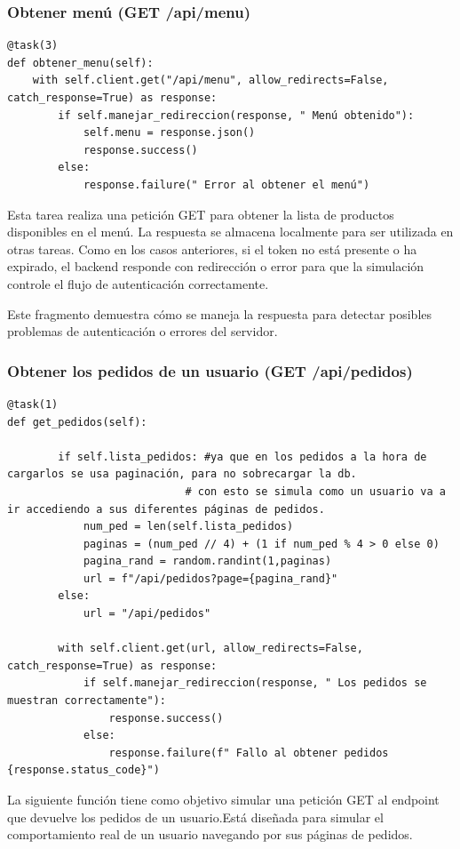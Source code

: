 \documentclass[10pt]{book}
\begin{document}
\subsubsection{Obtener menú (GET /api/menu)}

\begin{lstlisting}[style=pythonclean, caption={Tarea para obtener el menú de productos}]
@task(3)
def obtener_menu(self):
    with self.client.get("/api/menu", allow_redirects=False, catch_response=True) as response:
        if self.manejar_redireccion(response, " Menú obtenido"):
            self.menu = response.json()
            response.success()
        else:
            response.failure(" Error al obtener el menú")
\end{lstlisting}

Esta tarea realiza una petición GET para obtener la lista de productos disponibles en el menú. La respuesta se almacena localmente para ser utilizada en otras tareas. Como en los casos anteriores, si el token no está presente o ha expirado, el backend responde con redirección o error para que la simulación controle el flujo de autenticación correctamente.


Este fragmento demuestra cómo se maneja la respuesta para detectar posibles problemas de autenticación o errores del servidor.

\subsubsection{Obtener los pedidos de un usuario (GET /api/pedidos)}
\begin{lstlisting}[style=pythonclean, caption={Tarea para obtener el menú de productos}]
@task(1)
def get_pedidos(self):

        if self.lista_pedidos: #ya que en los pedidos a la hora de cargarlos se usa paginación, para no sobrecargar la db.
                            # con esto se simula como un usuario va a ir accediendo a sus diferentes páginas de pedidos.
            num_ped = len(self.lista_pedidos)
            paginas = (num_ped // 4) + (1 if num_ped % 4 > 0 else 0)
            pagina_rand = random.randint(1,paginas)
            url = f"/api/pedidos?page={pagina_rand}"
        else:
            url = "/api/pedidos"

        with self.client.get(url, allow_redirects=False, catch_response=True) as response:
            if self.manejar_redireccion(response, " Los pedidos se muestran correctamente"):
                response.success()
            else:
                response.failure(f" Fallo al obtener pedidos {response.status_code}")
\end{lstlisting}
La siguiente función tiene como objetivo simular una petición GET al endpoint que devuelve los pedidos de un usuario.Está diseñada para simular el comportamiento real de un usuario navegando por sus páginas de pedidos.
\end{document}
